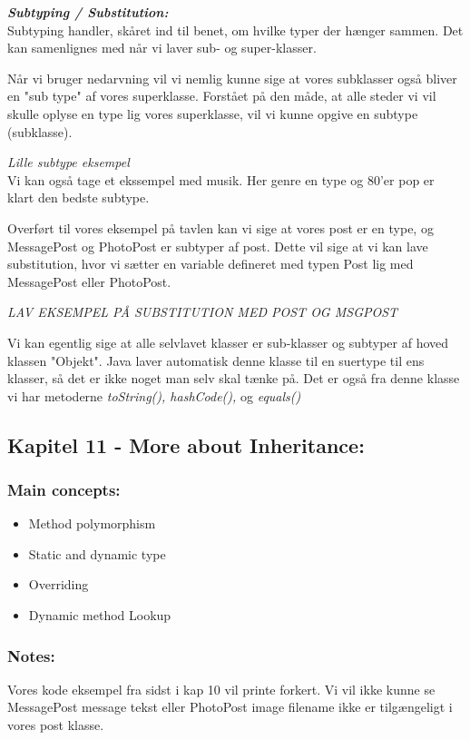 \documentclass[a4paper,12pt]{article}
\begin{document}
\textbf{\textit{Subtyping / Substitution:}} \\
Subtyping handler, skåret ind til benet, om hvilke typer der hænger sammen. Det kan samenlignes med når vi laver sub- og super-klasser.

Når vi bruger nedarvning vil vi nemlig kunne sige at vores subklasser også bliver en "sub type" af vores superklasse. Forstået på den måde, at alle steder vi vil skulle oplyse en type lig vores superklasse, vil vi kunne opgive en subtype (subklasse).

\textit{Lille subtype eksempel} \\
Vi kan også tage et ekssempel med musik. Her genre en type og 80'er pop er klart den bedste subtype. 

Overført til vores eksempel på tavlen kan vi sige at vores post er en type, og MessagePost og PhotoPost er subtyper af post. Dette vil sige at vi kan lave substitution, hvor vi sætter en variable defineret med typen Post lig med MessagePost eller PhotoPost.

\begin{center}
    \textit{LAV EKSEMPEL PÅ SUBSTITUTION MED POST OG MSGPOST}
\end{center}

Vi kan egentlig sige at alle selvlavet klasser er sub-klasser og subtyper af hoved klassen "Objekt". Java laver automatisk denne klasse til en suertype til ens klasser, så det er ikke noget man selv skal tænke på.
Det er også fra denne klasse vi har metoderne \textit{toString(), hashCode(),} og \textit{equals()}

\subsection*{Kapitel 11 - More about Inheritance:}
\subsubsection*{Main concepts:}
\begin{itemize}
    \item Method polymorphism
    \item Static and dynamic type
    \item Overriding
    \item Dynamic method Lookup
\end{itemize}

\subsubsection*{Notes:}
Vores kode eksempel fra sidst i kap 10 vil printe forkert. Vi vil ikke kunne se MessagePost message tekst eller PhotoPost image filename ikke er tilgængeligt i vores post klasse.
\end{document}
